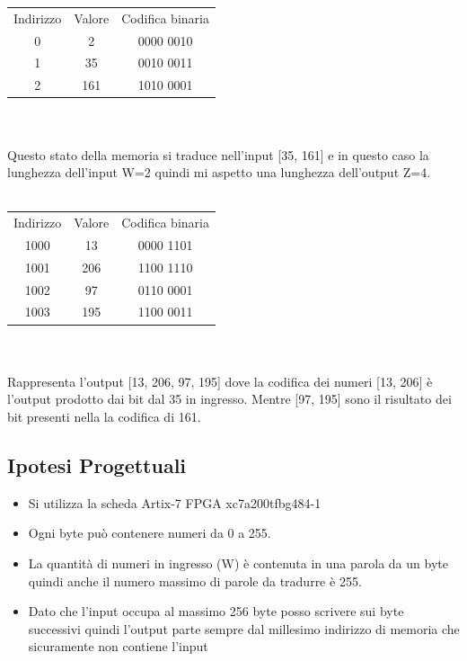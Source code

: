 \documentclass{article}
\begin{document}
\begin{tabular}{c c c}
	Indirizzo & Valore & Codifica binaria \\
	0 & 2 & 0000 0010 \\
	1 & 35 & 0010 0011 \\
	2 & 161 & 1010 0001 \\
\end{tabular}
\\
\\
Questo stato della memoria si traduce nell'input [35, 161] e in questo caso la lunghezza dell'input W=2 quindi mi aspetto una lunghezza dell'output Z=4.
\\
\\
\begin{tabular}{c c c}
	Indirizzo & Valore & Codifica binaria \\
	1000 & 13 & 0000 1101 \\
	1001 & 206 & 1100 1110 \\
	1002 & 97 & 0110 0001 \\
	1003 & 195 & 1100 0011 \\
\end{tabular}
\\
\\
Rappresenta l'output [13, 206, 97, 195] dove la codifica dei numeri [13, 206] è l'output prodotto dai bit dal 35 in ingresso. Mentre [97, 195] sono il risultato dei bit presenti nella la codifica di 161.

\subsection{Ipotesi Progettuali}
\begin{itemize}
\item {Si utilizza la scheda Artix-7 FPGA xc7a200tfbg484-1}
\item {Ogni byte può contenere numeri da 0 a 255.}
\item {La quantità di numeri in ingresso (W) è contenuta in una parola da un byte quindi anche il numero massimo di parole da tradurre è 255.}
\item {Dato che l'input occupa al massimo 256 byte posso scrivere sui byte successivi quindi l'output parte sempre dal millesimo indirizzo di memoria che sicuramente non contiene l'input}
\end{itemize}




\end{document}
